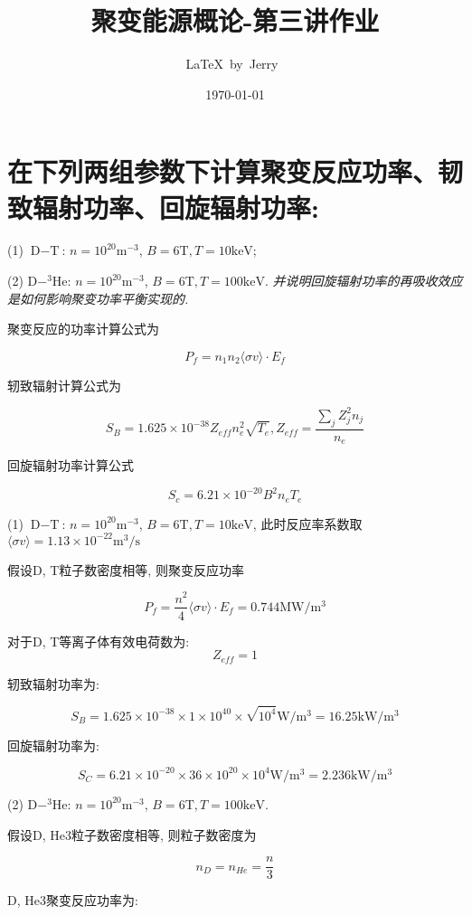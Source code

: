 \documentclass{article}
\title{聚变能源概论-第三讲作业}
\author{\LaTeX\ by\ Jerry\ }
\date{\today}
\begin{document}
\pagestyle{fancy}

\fancyhead[R]{\today}

\section*{在下列两组参数下计算聚变反应功率、韧致辐射功率、回旋辐射功率:}

(1) $\text{D}-\text{T}$: $n = 10^{20} \text{m}^{-3}$, $B = 6 \text{T}, T = 10 \text{keV}$;

(2) $\text{D}-^3\text{He}$: $n = 10^{20} \text{m}^{-3}$, $B = 6 \text{T}, T = 100 \text{keV}$. \emph{并说明回旋辐射功率的再吸收效应是如何影响聚变功率平衡实现的.}

聚变反应的功率计算公式为

$$P_f = n_1 n_2 \langle \sigma v \rangle \cdot E_f$$

轫致辐射计算公式为

$$S_B = 1.625 \times 10^{-38} Z_{eff} n_e^2\sqrt{T_e}, Z_{eff} = \frac{\sum_j Z_j^2n_j}{n_e}$$

回旋辐射功率计算公式

$$S_c = 6.21 \times 10^{-20} B^2n_eT_e$$

(1) $\text{D}-\text{T}$: $n = 10^{20} \text{m}^{-3}$, $B = 6 \text{T}, T = 10 \text{keV}$, 此时反应率系数取$\langle \sigma v \rangle = 1.13 \times 10^{-22} \text{m}^3/\text{s}$

假设D, T粒子数密度相等, 则聚变反应功率

$$P_f = \frac{n^2}{4} \langle \sigma v \rangle \cdot E_f = 0.744 \text{MW}/\text{m}^3$$

对于D, T等离子体有效电荷数为: $$Z_{eff} = 1$$

轫致辐射功率为:

$$S_B = 1.625 \times 10^{-38} \times 1 \times 10^{40} \times \sqrt{10^4}\text{W}/\text{m}^3 = 16.25 \text{kW}/\text{m}^3$$

回旋辐射功率为:

$$S_C = 6.21 \times 10^{-20} \times 36 \times 10^{20} \times 10^4\text{W}/\text{m}^3 = 2.236 \text{kW}/\text{m}^3$$

(2) $\text{D}-^3\text{He}$: $n = 10^{20} \text{m}^{-3}$, $B = 6 \text{T}, T = 100 \text{keV}$.

假设D, He3粒子数密度相等, 则粒子数密度为

$$n_D = n_{He} = \frac{n}{3}$$

D, He3聚变反应功率为:
\end{document}
